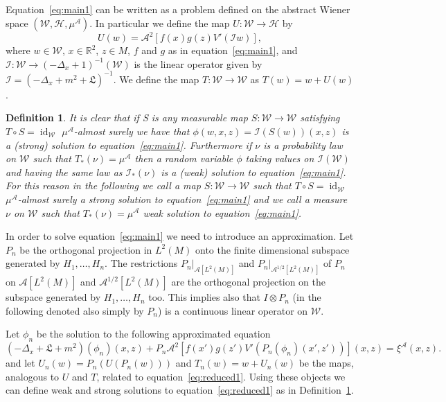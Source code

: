 \documentclass[a4paper,10pt]{article}
\newcommand{\asterisk}{\mathord{*}}
\newcommand{\nobracket}{}
\newcommand{\tmem}[1]{{\em #1\/}}
\newcommand{\tmop}[1]{\ensuremath{\operatorname{#1}}}
\newcommand{\tmtextit}[1]{{\itshape{#1}}}
\newtheorem{definition}[theorem]{Definition}
\begin{document}
Equation~{\eqref{eq:main1}} can be written as a problem defined on the
abstract Wiener space $(\mathcal{W}, \mathcal{H}, \mu^{\mathcal{A}})$. In
particular we define the map $U : \mathcal{W} \rightarrow \mathcal{H}$ by
\[ U (w) = \mathcal{A}^2 [f (x) g (z) V' (\mathcal{I} w)], \]
where $w \in \mathcal{W}$, $x \in \mathbb{R}^2$, $z \in M$, $f$ and $g$ as in
equation~{\eqref{eq:main1}}, and $\mathcal{I} : \mathcal{W} \rightarrow (-
\Delta_x + 1)^{- 1} (\mathcal{W})$ is the linear operator given by
$\mathcal{I} = (- \Delta_x + m^2 + \mathfrak{L})^{- 1}$. We define the map $T
: \mathcal{W} \rightarrow \mathcal{W}$ as $T (w) = w + U (w)$.

\begin{definition}
  \label{definition1}It is clear that if S is any measurable map $S :
  \mathcal{W} \rightarrow \mathcal{W}$ satisfying $T \circ S =
  \tmop{id}_{\mathcal{W}}$ $\mu^{\mathcal{A}}$-almost surely we have that
  $\phi (w, x, z) = \mathcal{I} (S (w)) (x, z)$ is a (strong) solution to
  equation~{\eqref{eq:main1}}. Furthermore if $\nu$ is a probability law on
  $\mathcal{W}$ such that $T_{\asterisk} (\nu) = \mu^{\mathcal{A}}$ then a
  random variable $\phi$ taking values on $\mathcal{} \mathcal{I}
  (\mathcal{W})$ and having the same law as $\mathcal{I}_{\asterisk} (\nu)$ is
  a (weak) solution to equation~{\eqref{eq:main1}}. For this reason in the
  following we call a map $S : \mathcal{W} \rightarrow \mathcal{W}$ such that
  $T \circ S = \tmop{id}_{\mathcal{W}}$ $\mu^{\mathcal{A}}$-almost surely
  {\tmem{a strong solution to equation~{\eqref{eq:main1}}}} and we call a
  measure $\nu$ on $\mathcal{W}$ such that $T_{\asterisk} (\nu) =
  \mu^{\mathcal{A}}$ \tmtextit{{\tmem{weak solution to
  equation~{\eqref{eq:main1}}}}}.
\end{definition}

In order to solve equation~{\eqref{eq:main1}} we need to introduce an
approximation. Let $P_n$ be the orthogonal projection in $L^2 (M)$ onto the
finite dimensional subspace generated by $H_1, \ldots, H_n$. The restrictions
$\nobracket P_n |_{\mathcal{A} [L^2 (M)]}$ and $\nobracket P_n
|_{\mathcal{A}^{1 / 2} [L^2 (M)]}$ of $P_n$ on $\mathcal{A} [L^2 (M)]$ and
$\mathcal{A}^{1 / 2} [L^2 (M)]$ are the orthogonal projection on the subspace
generated by $H_1, \ldots, H_n$ too. This implies also that $I \otimes P_n$
(in the following denoted also simply by $P_n$) is a continuous linear
operator on $\mathcal{W}$.

Let $\phi_n$ be the solution to the following approximated equation
\begin{equation}
  (- \Delta_x + \mathfrak{L} + m^2) (\phi_n) (x, z) + P_n \mathcal{A}^2 [f
  (x') g (z') V' (\mathcal{} P_n (\phi_n) (x', z'))] (x, z) = \mathcal{}
  \xi^{\mathcal{A}} (x, z) . \label{eq:reduced1}
\end{equation}
and let $U_n (w) = P_n (U (P_n (w)))$ and $T_n (w) = w + U_n (w)$ be the maps,
analogous to $U$ and $T$, related to equation~{\eqref{eq:reduced1}}. Using
these objects we can define weak and strong solutions to
equation~{\eqref{eq:reduced1}} as in Definition~\ref{definition1}.
\end{document}
